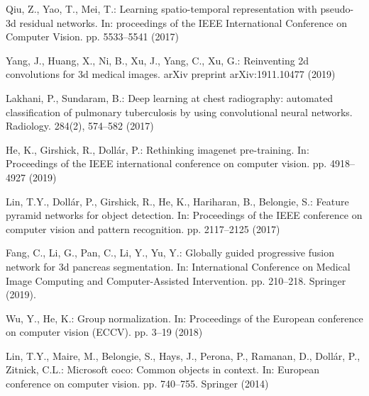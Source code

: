 \documentclass[runningheads]{llncs}
\begin{document}
\begin{thebibliography}{10}
Qiu, Z., Yao, T., Mei, T.: Learning spatio-temporal representation with
  pseudo-3d residual networks. In: proceedings of the IEEE International
  Conference on Computer Vision. pp. 5533--5541 (2017)

Yang, J., Huang, X., Ni, B., Xu, J., Yang, C., Xu, G.: Reinventing 2d
  convolutions for 3d medical images. arXiv preprint arXiv:1911.10477  (2019)

Lakhani, P., Sundaram, B.: Deep learning at chest radiography: automated
  classification of pulmonary tuberculosis by using convolutional neural
  networks. Radiology.  284(2),  574--582 (2017)

He, K., Girshick, R., Doll{\'a}r, P.: Rethinking imagenet pre-training. In:
  Proceedings of the IEEE international conference on computer vision. pp.
  4918--4927 (2019)


Lin, T.Y., Doll{\'a}r, P., Girshick, R., He, K., Hariharan, B., Belongie, S.:
  Feature pyramid networks for object detection. In: Proceedings of the IEEE
  conference on computer vision and pattern recognition. pp. 2117--2125 (2017)

Fang, C., Li, G., Pan, C., Li, Y., Yu, Y.: Globally guided progressive fusion
  network for 3d pancreas segmentation. In: International Conference on Medical
  Image Computing and Computer-Assisted Intervention. pp. 210--218. Springer
  (2019).

Wu, Y., He, K.: Group normalization. In: Proceedings of the European conference
  on computer vision (ECCV). pp. 3--19 (2018)

Lin, T.Y., Maire, M., Belongie, S., Hays, J., Perona, P., Ramanan, D.,
  Doll{\'a}r, P., Zitnick, C.L.: Microsoft coco: Common objects in context. In:
  European conference on computer vision. pp. 740--755. Springer (2014)


\end{thebibliography}
 
\end{document}
